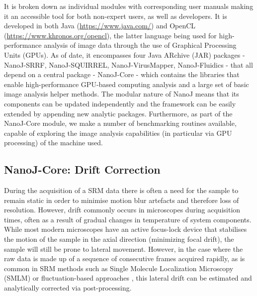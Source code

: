  It is broken down as individual modules with corresponding user manuals making it an accessible tool for both non-expert users, as well as developers. It is developed in both Java (\href{https://www.java.com/}{https://www.java.com/}) and OpenCL (\href{https://www.khronos.org/opencl}{https://www.khronos.org/opencl}), the latter language being used for high-performance analysis of image data through the use of Graphical Processing Units (GPUs). As of date, it encompasses four Java ARchive (JAR) packages - NanoJ-SRRF, NanoJ-SQUIRREL, NanoJ-VirusMapper, NanoJ-Fluidics - that all depend on a central package - NanoJ-Core - which contains the libraries that enable high-performance GPU-based computing analysis and a large set of basic image analysis helper methods. The modular nature of NanoJ means that its components can be updated independently and the framework can be easily extended by appending new analytic packages. Furthermore, as part of the NanoJ-Core module, we make a number of benchmarking routines available, capable of exploring the image analysis capabilities (in particular via GPU processing) of the machine used.

\subsection*{NanoJ-Core: Drift Correction}
 During the acquisition of a SRM data there is often a need for the sample to remain static in order to minimise motion blur artefacts and therefore loss of resolution. However, drift commonly occurs in microscopes during acquisition times, often as a result of gradual changes in temperature of system components. While most modern microscopes have an active focus-lock device that stabilises the motion of the sample in the axial direction (minimizing focal drift), the sample will still be prone to lateral movement. However, in the case where the raw data is made up of a sequence of consecutive frames acquired rapidly, as is common in SRM methods such as Single Molecule Localization Microscopy (SMLM) \cite{betzig2006imaging,rust2006sub} or fluctuation-based approaches \cite{gustafsson2016fast,dertinger2009fast,cox2012bayesian}, this lateral drift can be estimated and analytically corrected via post-processing.
 
